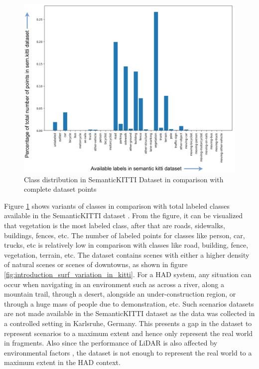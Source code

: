 \begin{figure}[htb]
    \centering
    \includegraphics[width=1\linewidth]{97_graphics//related_work/ratio_with_total_points_kitti.pdf}
    \caption{Class distribution in SemanticKITTI Dataset in comparison with complete dataset points}
    \label{fig:related_work-ratio_with_total_points_kitti}
\end{figure}

Figure \ref{fig:related_work-ratio_with_total_points_kitti} shows variants of classes in comparison with total labeled classes available in the SemanticKITTI dataset \parencite{behley2019semantickitti, sem_kitti_total_points_ratio}. From the figure, it can be visualized that vegetation is the most labeled class, after that are roads, sidewalks, buildings, fences, etc. The number of labeled points for classes like person, car, trucks, etc is relatively low in comparison with classes like road, building, fence, vegetation, terrain, etc. The dataset contains scenes with either a higher density of natural scenes or scenes of downtowns, as shown in figure \ref{fig:introduction_surf_variation_in_kitti}. For a HAD system, any situation can occur when navigating in an environment such as across a river, along a mountain trail, through a desert, alongside an under-construction region, or through a huge mass of people due to demonstration, etc. Such scenarios datasets are not made available in the SemanticKITTI dataset as the data was collected in a controlled setting in Karlsruhe, Germany. This presents a gap in the dataset to represent scenarios to a maximum extent and hence only represent the real world in fragments. Also since the performance of LiDAR is also affected by environmental factors \parencite{park2023automotive}, the dataset is not enough to represent the real world to a maximum extent in the HAD context.

